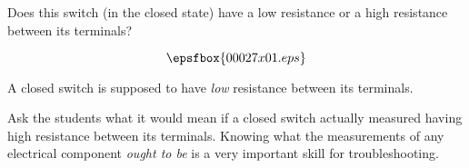 

Does this switch (in the closed state) have a low resistance or a high resistance between its terminals?

$$\epsfbox{00027x01.eps}$$







A closed switch is supposed to have {\it low} resistance between its terminals.







Ask the students what it would mean if a closed switch actually measured having high resistance between its terminals.  Knowing what the measurements of any electrical component {\it ought to be} is a very important skill for troubleshooting.




